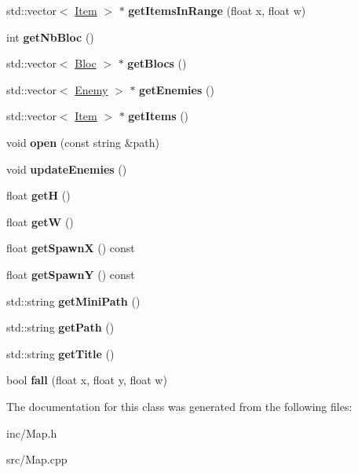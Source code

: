 \begin{DoxyCompactItemize}
std\+::vector$<$ \hyperlink{class_item}{Item} $>$ $\ast$ {\bfseries get\+Items\+In\+Range} (float x, float w)
\item 
\mbox{\label{class_map_ad1822eb34d49b91796599daa90d6fcc8}} 
int {\bfseries get\+Nb\+Bloc} ()
\item 
\mbox{\label{class_map_a08b571aa94c59a41ab646311504d3af9}} 
std\+::vector$<$ \hyperlink{class_bloc}{Bloc} $>$ $\ast$ {\bfseries get\+Blocs} ()
\item 
\mbox{\label{class_map_a6168b5804d06a0462afd76bb234685b9}} 
std\+::vector$<$ \hyperlink{class_enemy}{Enemy} $>$ $\ast$ {\bfseries get\+Enemies} ()
\item 
\mbox{\label{class_map_a746d12f1d91bed6e1e243bca50e6fa9a}} 
std\+::vector$<$ \hyperlink{class_item}{Item} $>$ $\ast$ {\bfseries get\+Items} ()
\item 
\mbox{\label{class_map_ae15bbb0a73703d8e9bbc4f80b511aac3}} 
void {\bfseries open} (const string \&path)
\item 
\mbox{\label{class_map_a1509c81d2f9ab6626a57e42e790850d4}} 
void {\bfseries update\+Enemies} ()
\item 
\mbox{\label{class_map_a523bfb9f7a26d70905093c005b7b6d44}} 
float {\bfseries getH} ()
\item 
\mbox{\label{class_map_a977ef84d621e6ed348e65de66ba2e981}} 
float {\bfseries getW} ()
\item 
\mbox{\label{class_map_ac2afba890b15084e56136111fb40169c}} 
float {\bfseries get\+SpawnX} () const
\item 
\mbox{\label{class_map_a2c6885440298accab8e3a223e3c70626}} 
float {\bfseries get\+SpawnY} () const
\item 
\mbox{\label{class_map_a129ab8c5fb2c96679308049f14b254a7}} 
std\+::string {\bfseries get\+Mini\+Path} ()
\item 
\mbox{\label{class_map_a8ae5eff73773a478777b61876da5b15f}} 
std\+::string {\bfseries get\+Path} ()
\item 
\mbox{\label{class_map_a7a00c22a66333e8a59255413b3f03bb9}} 
std\+::string {\bfseries get\+Title} ()
\item 
\mbox{\label{class_map_abf737727a0a0710ff124ea1641ceec26}} 
bool {\bfseries fall} (float x, float y, float w)
\end{DoxyCompactItemize}


The documentation for this class was generated from the following files\+:\begin{DoxyCompactItemize}
\item 
inc/Map.\+h\item 
src/Map.\+cpp\end{DoxyCompactItemize}
